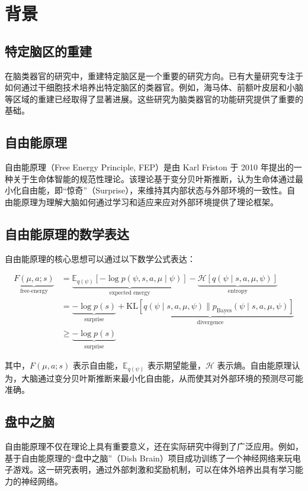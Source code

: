 \chapter{背景}\label{chap:background}

\section{特定脑区的重建}\label{sec:brain-region-reconstruction}
在脑类器官的研究中，重建特定脑区是一个重要的研究方向\cite{Kim2023}。已有大量研究专注于如何通过干细胞技术培养出特定脑区的类器官。例如，海马体、前额叶皮层和小脑等区域的重建已经取得了显著进展。这些研究为脑类器官的功能研究提供了重要的基础。

\section{自由能原理}\label{sec:free-energy-principle}
自由能原理（Free Energy Principle, FEP）是由 Karl Friston 于 2010 年提出的一种关于生命体智能的规范性理论\cite{Friston2010}。该理论基于变分贝叶斯推断，认为生命体通过最小化自由能，即“惊奇”（Surprise），来维持其内部状态与外部环境的一致性。自由能原理为理解大脑如何通过学习和适应来应对外部环境提供了理论框架。

\section{自由能原理的数学表达}\label{sec:free-energy-math}
自由能原理的核心思想可以通过以下数学公式表达：

\[
    \begin{aligned}
        \underbrace{F(\mu, a; s)}_{\text{free-energy}} & = \underbrace{\mathbb{E}_{q(\psi)} \left[ -\log p(\psi, s, a, \mu \mid \psi) \right]}_{\text{expected energy}} - \underbrace{\mathcal{H}[q(\psi \mid s, a, \mu, \psi)]}_{\text{entropy}} \\
                                                       & = \underbrace{-\log p(s)}_{\text{surprise}} + \underbrace{\text{KL}[q(\psi \mid s, a, \mu, \psi) \parallel p_{\text{Bayes}}(\psi \mid s, a, \mu, \psi)]}_{\text{divergence}}             \\
                                                       & \geq \underbrace{-\log p(s)}_{\text{surprise}}
    \end{aligned}
\]

其中，$F(\mu, a; s)$ 表示自由能，$\mathbb{E}_{q(\psi)}$ 表示期望能量，$\mathcal{H}$ 表示熵。自由能原理认为，大脑通过变分贝叶斯推断来最小化自由能，从而使其对外部环境的预测尽可能准确。

\section{盘中之脑}\label{sec:dish-brain}
自由能原理不仅在理论上具有重要意义，还在实际研究中得到了广泛应用。例如，基于自由能原理的“盘中之脑”（Dish Brain）项目成功训练了一个神经网络来玩电子游戏\cite{Kagan2022}。这一研究表明，通过外部刺激和奖励机制，可以在体外培养出具有学习能力的神经网络。

